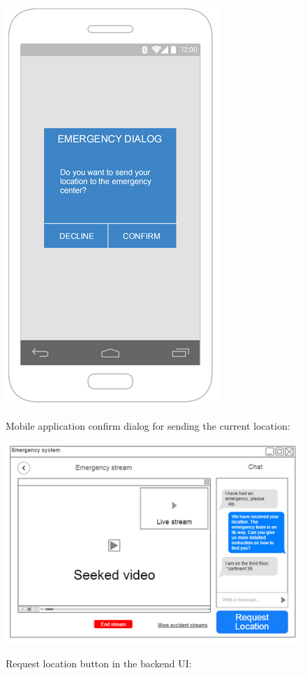 \documentclass{article}
\begin{document}
	\begin{figure}[h]
		\centering
		\includegraphics[width=.6\textwidth]{"Auto/3"}

		Mobile application confirm dialog for sending the current location:
	\end{figure} \clearpage
	
	
	\begin{figure}[h]
	\vspace{-30pt}
		\centering
		\includegraphics[width=.8\textwidth]{"Auto/4"}

		Request location button in the backend UI:

	\end{figure}
	
\end{document}
